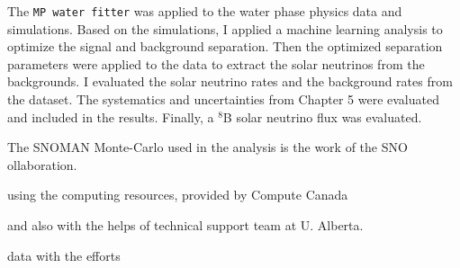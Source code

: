 The \texttt{MP water fitter} was applied to the water phase physics data and simulations. Based on the simulations, I applied a machine learning analysis to optimize the signal and background separation. Then the optimized separation parameters were applied to the data to extract the solar neutrinos from the backgrounds. I evaluated the solar neutrino rates and the background rates from the dataset. The systematics and uncertainties from Chapter 5 were evaluated and included in the results. Finally, a $^8$B solar neutrino flux was evaluated.

 The SNOMAN Monte-Carlo used in the analysis is
the work of the SNO 
ollaboration.




 using the computing resources, provided by Compute Canada
 
 and also with the helps of technical support team at U. Alberta.
 
 data with the efforts